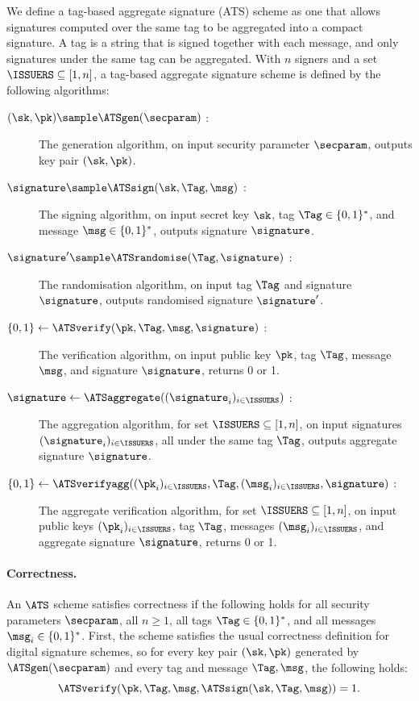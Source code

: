 We define a tag-based aggregate signature (ATS) scheme as one that allows
signatures computed over the same tag to be aggregated into a compact signature.
A tag is a string that is signed together with each message, and only signatures
under the same tag can be aggregated. With $n$ signers and a set $\ISSUERS
\subseteq [1,n]$, a tag-based aggregate signature scheme is defined by
the following algorithms:

\begin{description}

  \item[$(\sk, \pk) \sample \ATSgen(\secparam)$ :] The generation algorithm, on
input security parameter $\secparam$, outputs key pair $(\sk,\pk)$.

  \item[$\signature \sample \ATSsign(\sk, \Tag, \msg)$ :] The signing algorithm,
on input secret key $\sk$, tag $\Tag \in \{0,1\}^*$, and message $\msg \in
\{0,1\}^*$, outputs signature $\signature$.

  \item[$ \signature' \sample \ATSrandomise(\Tag, \signature)$ :] The
randomisation algorithm, on input tag $\Tag$ and signature $\signature$, outputs
randomised signature $\signature'$.

  \item[$ \{0,1\} \leftarrow \ATSverify(\pk, \Tag, \msg, \signature)$ :] The
verification algorithm, on input public key $\pk$, tag $\Tag$, message $\msg$,
and signature $\signature$, returns 0 or 1.

  \item[$\signature \leftarrow \ATSaggregate((\signature_i)_{i \in \ISSUERS})$
:] The aggregation algorithm, for set $\ISSUERS \subseteq [1, n]$, on input
signatures $(\signature_i)_{i \in \ISSUERS}$, all under the same tag $\Tag$,
outputs aggregate signature $\signature$.

  \item[$\{0,1\} \leftarrow \ATSverifyagg((\pk_i)_{i\in \ISSUERS}, \Tag,
(\msg_i)_{i\in \ISSUERS}, \signature)$ :] The aggregate verification algorithm,
for set $\ISSUERS \subseteq [1, n]$, on input public keys $(\pk_i)_{i\in
\ISSUERS}$, tag $\Tag$, messages $(\msg_i)_{i\in \ISSUERS}$, and aggregate
signature $\signature$, returns 0 or 1.

\end{description}

\paragraph{Correctness.} An $\ATS$ scheme satisfies correctness if the
following holds for all security parameters $\secparam$, all $n \geq 1$, all
tags $\Tag \in \{0,1\}^*$, and all messages $\msg_i \in \{0,1\}^*$. First,
the scheme satisfies the usual correctness definition for digital signature
schemes, so for every key pair $(\sk,\pk)$ generated by $\ATSgen(\secparam)$ and
every tag and message $\Tag, \msg$, the following holds:
%
\begin{equation*}
%
  \ATSverify(\pk, \Tag, \msg, \ATSsign(\sk, \Tag, \msg)) = 1.
%
\end{equation*}
%

